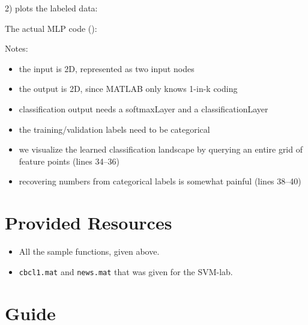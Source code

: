 \documentclass[11pt,noanswers,addpoints]{exam}
\begin{document}
2)  plots the labeled data:
\bigskip

The actual MLP code ():


Notes:
\begin{itemize}
\item the input is 2D, represented as two input nodes
\item the output is 2D, since MATLAB only knows 1-in-k coding
\item classification output needs a softmaxLayer and a classificationLayer
\item the training/validation labels need to be categorical
\item we visualize the learned classification landscape by querying an entire grid of feature points (lines 34--36)
\item recovering numbers from categorical labels is somewhat painful (lines 38--40)
\end{itemize}

\section{Provided Resources}

\begin{itemize}

\item All the sample functions, given above.

\item \texttt{cbcl1.mat} and \texttt{news.mat} that was given for the SVM-lab.
\end{itemize}

\section{Guide}
\end{document}
